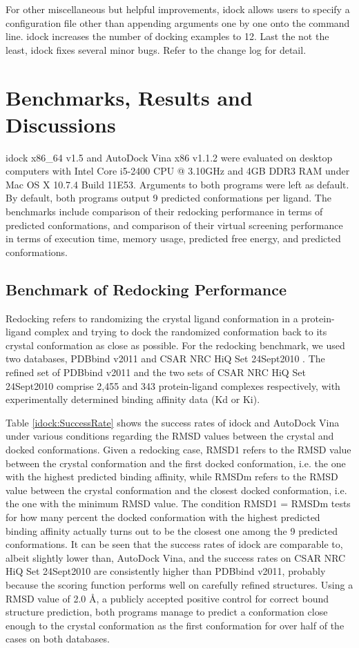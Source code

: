 For other miscellaneous but helpful improvements, idock allows users to specify a configuration file other than appending arguments one by one onto the command line. idock increases the number of docking examples to 12. Last the not the least, idock fixes several minor bugs. Refer to the change log for detail.

\section{Benchmarks, Results and Discussions}

idock x86\_64 v1.5 and AutoDock Vina x86 v1.1.2 were evaluated on desktop computers with Intel Core i5-2400 CPU @ 3.10GHz and 4GB DDR3 RAM under Mac OS X 10.7.4 Build 11E53. Arguments to both programs were left as default. By default, both programs output 9 predicted conformations per ligand. The benchmarks include comparison of their redocking performance in terms of predicted conformations, and comparison of their virtual screening performance in terms of execution time, memory usage, predicted free energy, and predicted conformations.

\subsection{Benchmark of Redocking Performance}

Redocking refers to randomizing the crystal ligand conformation in a protein-ligand complex and trying to dock the randomized conformation back to its crystal conformation as close as possible. For the redocking benchmark, we used two databases, PDBbind v2011 \citep{529,530} and CSAR NRC HiQ Set 24Sept2010 \citep{857,960}. The refined set of PDBbind v2011 and the two sets of CSAR NRC HiQ Set 24Sept2010 comprise 2,455 and 343 protein-ligand complexes respectively, with experimentally determined binding affinity data (Kd or Ki).

Table \ref{idock:SuccessRate} shows the success rates of idock and AutoDock Vina under various conditions regarding the RMSD values between the crystal and docked conformations. Given a redocking case, RMSD1 refers to the RMSD value between the crystal conformation and the first docked conformation, i.e. the one with the highest predicted binding affinity, while RMSDm refers to the RMSD value between the crystal conformation and the closest docked conformation, i.e. the one with the minimum RMSD value. The condition RMSD1 = RMSDm tests for how many percent the docked conformation with the highest predicted binding affinity actually turns out to be the closest one among the 9 predicted conformations. It can be seen that the success rates of idock are comparable to, albeit slightly lower than, AutoDock Vina, and the success rates on CSAR NRC HiQ Set 24Sept2010 are consistently higher than PDBbind v2011, probably because the scoring function performs well on carefully refined structures. Using a RMSD value of 2.0 \AA, a publicly accepted positive control for correct bound structure prediction, both programs manage to predict a conformation close enough to the crystal conformation as the first conformation for over half of the cases on both databases.

